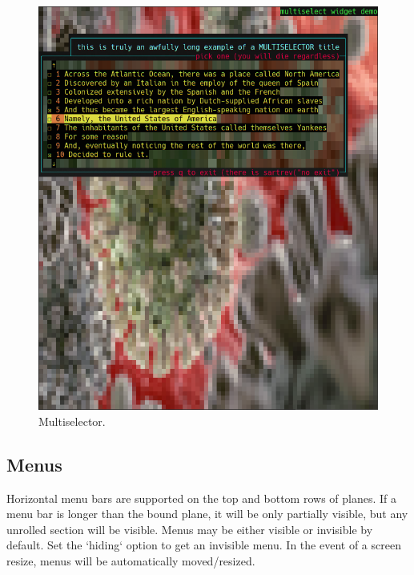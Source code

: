 \documentclass[letterpaper,10pt]{article}
\begin{document}
\begin{figure}
    \centering
    \includegraphics[width=1\linewidth]{media/multiselector.png}
    \caption{Multiselector.}
\end{figure}

\subsection{Menus}
\label{sec:menus}

Horizontal menu bars are supported on the top and bottom rows of planes. If a
menu bar is longer than the bound plane, it will be only partially visible, but
any unrolled section will be visible. Menus may be either visible or invisible
by default. Set the `hiding` option to get an invisible menu. In the event of a
screen resize, menus will be automatically moved/resized.
\end{document}
